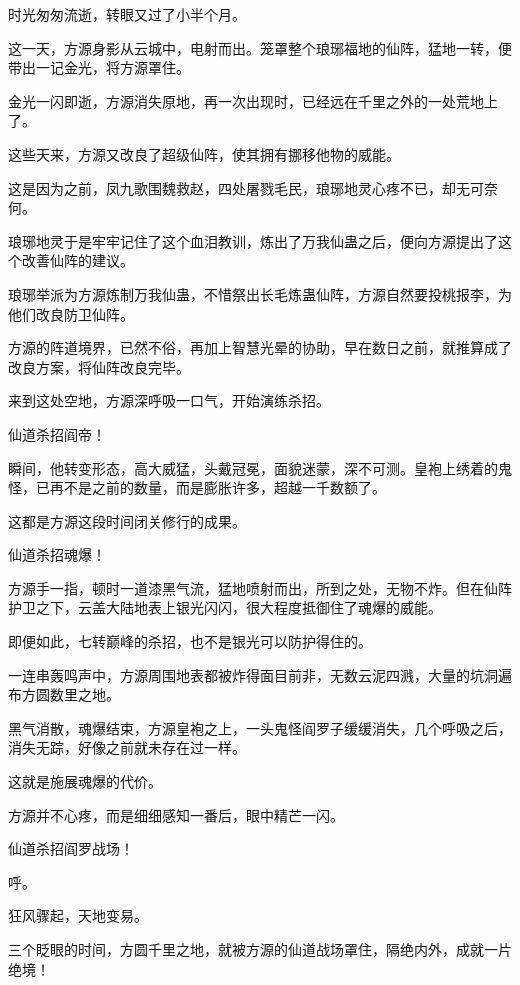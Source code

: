 
\begin{this_body}



时光匆匆流逝，转眼又过了小半个月。

这一天，方源身影从云城中，电射而出。笼罩整个琅琊福地的仙阵，猛地一转，便带出一记金光，将方源罩住。

金光一闪即逝，方源消失原地，再一次出现时，已经远在千里之外的一处荒地上了。

这些天来，方源又改良了超级仙阵，使其拥有挪移他物的威能。

这是因为之前，凤九歌围魏救赵，四处屠戮毛民，琅琊地灵心疼不已，却无可奈何。

琅琊地灵于是牢牢记住了这个血泪教训，炼出了万我仙蛊之后，便向方源提出了这个改善仙阵的建议。

琅琊举派为方源炼制万我仙蛊，不惜祭出长毛炼蛊仙阵，方源自然要投桃报李，为他们改良防卫仙阵。

方源的阵道境界，已然不俗，再加上智慧光晕的协助，早在数日之前，就推算成了改良方案，将仙阵改良完毕。

来到这处空地，方源深呼吸一口气，开始演练杀招。

仙道杀招阎帝！

瞬间，他转变形态，高大威猛，头戴冠冕，面貌迷蒙，深不可测。皇袍上绣着的鬼怪，已再不是之前的数量，而是膨胀许多，超越一千数额了。

这都是方源这段时间闭关修行的成果。

仙道杀招魂爆！

方源手一指，顿时一道漆黑气流，猛地喷射而出，所到之处，无物不炸。但在仙阵护卫之下，云盖大陆地表上银光闪闪，很大程度抵御住了魂爆的威能。

即便如此，七转巅峰的杀招，也不是银光可以防护得住的。

一连串轰鸣声中，方源周围地表都被炸得面目前非，无数云泥四溅，大量的坑洞遍布方圆数里之地。

黑气消散，魂爆结束，方源皇袍之上，一头鬼怪阎罗子缓缓消失，几个呼吸之后，消失无踪，好像之前就未存在过一样。

这就是施展魂爆的代价。

方源并不心疼，而是细细感知一番后，眼中精芒一闪。

仙道杀招阎罗战场！

呼。

狂风骤起，天地变易。

三个眨眼的时间，方圆千里之地，就被方源的仙道战场罩住，隔绝内外，成就一片绝境！


\end{this_body}
